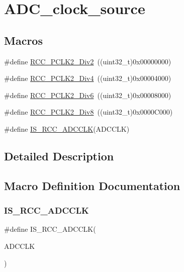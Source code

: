 \hypertarget{group___a_d_c__clock__source}{}\section{A\+D\+C\+\_\+clock\+\_\+source}
\label{group___a_d_c__clock__source}
\subsection*{Macros}
\begin{DoxyCompactItemize}
\item 
\#define \mbox{\hyperlink{group___a_d_c__clock__source_ga6c341971f2f161320ad150faa3636b41}{R\+C\+C\+\_\+\+P\+C\+L\+K2\+\_\+\+Div2}}~((uint32\+\_\+t)0x00000000)
\item 
\#define \mbox{\hyperlink{group___a_d_c__clock__source_gaecc7a9370fb7d7772d9c90888792084c}{R\+C\+C\+\_\+\+P\+C\+L\+K2\+\_\+\+Div4}}~((uint32\+\_\+t)0x00004000)
\item 
\#define \mbox{\hyperlink{group___a_d_c__clock__source_gaffb34a845f94f4ea741a45998d28deb3}{R\+C\+C\+\_\+\+P\+C\+L\+K2\+\_\+\+Div6}}~((uint32\+\_\+t)0x00008000)
\item 
\#define \mbox{\hyperlink{group___a_d_c__clock__source_ga77d5c803e2d31a806467bb7db9d24cd0}{R\+C\+C\+\_\+\+P\+C\+L\+K2\+\_\+\+Div8}}~((uint32\+\_\+t)0x0000\+C000)
\item 
\#define \mbox{\hyperlink{group___a_d_c__clock__source_ga6a9c4fb239566f0f3d44c8cc266e528b}{I\+S\+\_\+\+R\+C\+C\+\_\+\+A\+D\+C\+C\+LK}}(A\+D\+C\+C\+LK)
\end{DoxyCompactItemize}


\subsection{Detailed Description}


\subsection{Macro Definition Documentation}
\mbox{\label{group___a_d_c__clock__source_ga6a9c4fb239566f0f3d44c8cc266e528b}} 
\subsubsection{\texorpdfstring{IS\_RCC\_ADCCLK}{IS\_RCC\_ADCCLK}}
{\footnotesize\ttfamily \#define I\+S\+\_\+\+R\+C\+C\+\_\+\+A\+D\+C\+C\+LK(\begin{DoxyParamCaption}\item[{}]{A\+D\+C\+C\+LK }\end{DoxyParamCaption})}

